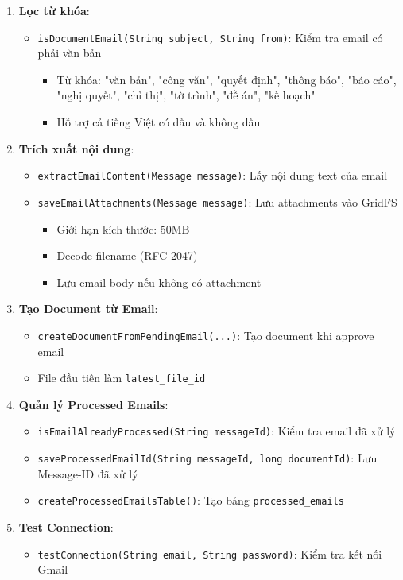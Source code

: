 \documentclass[12pt,a4paper]{article}
\begin{document}
\begin{enumerate}
    \item \textbf{Lọc từ khóa}:
    \begin{itemize}
        \item \texttt{isDocumentEmail(String subject, String from)}: Kiểm tra email có phải văn bản
        \begin{itemize}
            \item Từ khóa: "văn bản", "công văn", "quyết định", "thông báo", "báo cáo", "nghị quyết", "chỉ thị", "tờ trình", "đề án", "kế hoạch"
            \item Hỗ trợ cả tiếng Việt có dấu và không dấu
        \end{itemize}
    \end{itemize}
    
    \item \textbf{Trích xuất nội dung}:
    \begin{itemize}
        \item \texttt{extractEmailContent(Message message)}: Lấy nội dung text của email
        \item \texttt{saveEmailAttachments(Message message)}: Lưu attachments vào GridFS
        \begin{itemize}
            \item Giới hạn kích thước: 50MB
            \item Decode filename (RFC 2047)
            \item Lưu email body nếu không có attachment
        \end{itemize}
    \end{itemize}
    
    \item \textbf{Tạo Document từ Email}:
    \begin{itemize}
        \item \texttt{createDocumentFromPendingEmail(...)}: Tạo document khi approve email
        \item File đầu tiên làm \texttt{latest\_file\_id}
    \end{itemize}
    
    \item \textbf{Quản lý Processed Emails}:
    \begin{itemize}
        \item \texttt{isEmailAlreadyProcessed(String messageId)}: Kiểm tra email đã xử lý
        \item \texttt{saveProcessedEmailId(String messageId, long documentId)}: Lưu Message-ID đã xử lý
        \item \texttt{createProcessedEmailsTable()}: Tạo bảng \texttt{processed\_emails}
    \end{itemize}
    
    \item \textbf{Test Connection}:
    \begin{itemize}
        \item \texttt{testConnection(String email, String password)}: Kiểm tra kết nối Gmail
    \end{itemize}
\end{enumerate}
\end{document}

